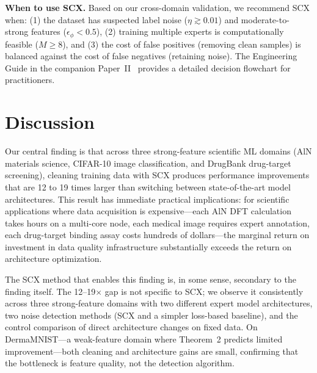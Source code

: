 \documentclass[12pt,a4paper]{article}
\begin{document}
\textbf{When to use SCX.} Based on our cross-domain validation, we recommend SCX when: (1) the dataset has suspected label noise ($\eta \gtrsim 0.01$) and moderate-to-strong features ($\epsilon_\phi < 0.5$), (2) training multiple experts is computationally feasible ($M \geq 8$), and (3) the cost of false positives (removing clean samples) is balanced against the cost of false negatives (retaining noise). The Engineering Guide in the companion Paper~II~\cite{scx2025curation} provides a detailed decision flowchart for practitioners.

\section{Discussion}

Our central finding is that across three strong-feature scientific ML domains (AlN materials science, CIFAR-10 image classification, and DrugBank drug-target screening), cleaning training data with SCX produces performance improvements that are 12 to 19 times larger than switching between state-of-the-art model architectures. This result has immediate practical implications: for scientific applications where data acquisition is expensive---each AlN DFT calculation takes hours on a multi-core node, each medical image requires expert annotation, each drug-target binding assay costs hundreds of dollars---the marginal return on investment in data quality infrastructure substantially exceeds the return on architecture optimization.

The SCX method that enables this finding is, in some sense, secondary to the finding itself. The 12--19$\times$ gap is not specific to SCX; we observe it consistently across three strong-feature domains with two different expert model architectures, two noise detection methods (SCX and a simpler loss-based baseline), and the control comparison of direct architecture changes on fixed data. On DermaMNIST---a weak-feature domain where Theorem~2 predicts limited improvement---both cleaning and architecture gains are small, confirming that the bottleneck is feature quality, not the detection algorithm.
\end{document}
